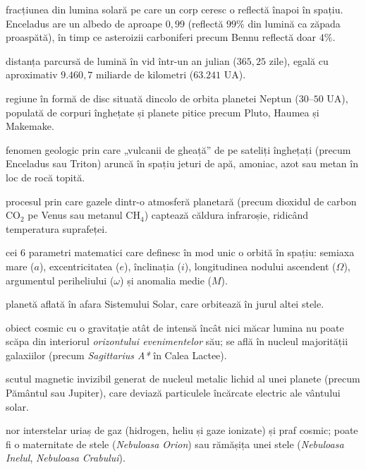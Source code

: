 \begin{description}[leftmargin=1.2em, itemsep=4pt]
  \item[Albedo:] fracțiunea din lumina solară pe care un corp ceresc o reflectă înapoi în spațiu. Enceladus are un albedo de aproape $0{,}99$ (reflectă $99\%$ din lumină ca zăpada proaspătă), în timp ce asteroizii carboniferi precum Bennu reflectă doar $4\%$.
  \item[An-lumină (a.l.):] distanța parcursă de lumină în vid într-un an julian ($365{,}25\text{ zile}$), egală cu aproximativ $9.460{,}7\text{ miliarde de kilometri}$ ($63.241\text{ UA}$).
  \item[Centura Kuiper:] regiune în formă de disc situată dincolo de orbita planetei Neptun ($30\text{--}50\text{ UA}$), populată de corpuri înghețate și planete pitice precum Pluto, Haumea și Makemake.
  \item[Criovulcanism:] fenomen geologic prin care „vulcanii de gheață” de pe sateliți înghețați (precum Enceladus sau Triton) aruncă în spațiu jeturi de apă, amoniac, azot sau metan în loc de rocă topită.
  \item[Efect de seră:] procesul prin care gazele dintr-o atmosferă planetară (precum dioxidul de carbon $\text{CO}_2$ pe Venus sau metanul $\text{CH}_4$) captează căldura infraroșie, ridicând temperatura suprafeței.
  \item[Elemente kepleriene:] cei 6 parametri matematici care definesc în mod unic o orbită în spațiu: semiaxa mare ($a$), excentricitatea ($e$), înclinația ($i$), longitudinea nodului ascendent ($\Omega$), argumentul periheliului ($\omega$) și anomalia medie ($M$).
  \item[Exoplanetă:] planetă aflată în afara Sistemului Solar, care orbitează în jurul altei stele.
  \item[Gaură neagră supermasivă:] obiect cosmic cu o gravitație atât de intensă încât nici măcar lumina nu poate scăpa din interiorul \emph{orizontului evenimentelor} său; se află în nucleul majorității galaxiilor (precum \emph{Sagittarius A*} în Calea Lactee).
  \item[Magnetosferă:] scutul magnetic invizibil generat de nucleul metalic lichid al unei planete (precum Pământul sau Jupiter), care deviază particulele încărcate electric ale vântului solar.
  \item[Nebuloasă:] nor interstelar uriaș de gaz (hidrogen, heliu și gaze ionizate) și praf cosmic; poate fi o maternitate de stele (\emph{Nebuloasa Orion}) sau rămășița unei stele (\emph{Nebuloasa Inelul}, \emph{Nebuloasa Crabului}).

\end{description}
